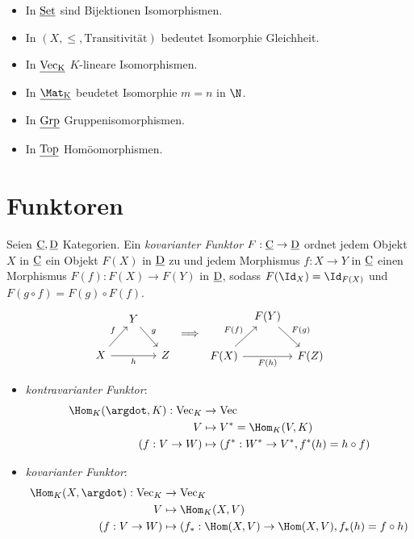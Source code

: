 \begin{ex}
	\begin{itemize}
		\item
			In $\underline{\mathrm{Set}}$ sind Bijektionen Isomorphismen.
		\item
			In $(X, \le, \text{Transitivität})$ bedeutet Isomorphie Gleichheit.
		\item
			In $\underline{\mathrm{\operatorname{Vec}_K}}$ $K$-lineare Isomorphismen.
		\item
			In $\Cat{\Mat_K}$ beudetet Isomorphie $m = n$ in $\N$.
		\item
			In $\underline{\mathrm{Grp}}$ Gruppenisomorphismen.
		\item
			In $\underline{\mathrm{Top}}$ Homöomorphismen.
	\end{itemize}
\end{ex}


\section{Funktoren}


\begin{df}
	Seien $\underline{\mathrm{C}}, \underline{\mathrm{D}}$ Kategorien.
	Ein \emph{kovarianter Funktor} $F: \underline{\mathrm{C}} \to \underline{\mathrm{D}}$ ordnet jedem Objekt $X$ in $\underline{\mathrm{C}}$ ein Objekt $F(X)$ in $\underline{\mathrm{D}}$ zu und jedem Morphismus $f: X \to Y$ in $\underline{\mathrm{C}}$ einen Morphismus $F(f) : F(X) \to F(Y)$ in $\underline{\mathrm{D}}$, sodass $F(\Id_X) = \Id_{F(X)}$ und $F(g\circ f) = F(g) \circ F(f)$.
	\[
		\begin{tikzcd}[column sep=small]
			~ & Y \arrow{dr}{g} & \\
			X \arrow{ur}{f} \arrow{rr}[swap]{h} & & Z
		\end{tikzcd}
		\implies
		\begin{tikzcd}[column sep=tiny]
			~ & F(Y) \arrow{dr}{F(g)} & \\
			F(X) \arrow{ur}{F(f)} \arrow{rr}[swap]{F(h)} & & F(Z)
		\end{tikzcd}
	\]
\end{df}

\begin{ex}
	\begin{itemize}
		\item
			\emph{kontravarianter Funktor}:
			\begin{align*}
				\Hom_K(\argdot, K): \Vec_K &\to \Vec \\
				V &\mapsto V^* = \Hom_K(V,K) \\
				(f: V \to W) &\mapsto (f^*: W^* \to V^*, f^*(h) = h \circ f)
			\end{align*}
		\item
			\emph{kovarianter Funktor}:
			\begin{align*}
				\Hom_K(X, \argdot) : \Vec_K &\to \Vec_K \\
				V & \mapsto \Hom_K(X, V) \\
				(f: V \to W) & \mapsto (f_*: \Hom(X, V) \to \Hom(X, V), f_*(h) = f \circ h)
			\end{align*}
	\end{itemize}
\end{ex}

